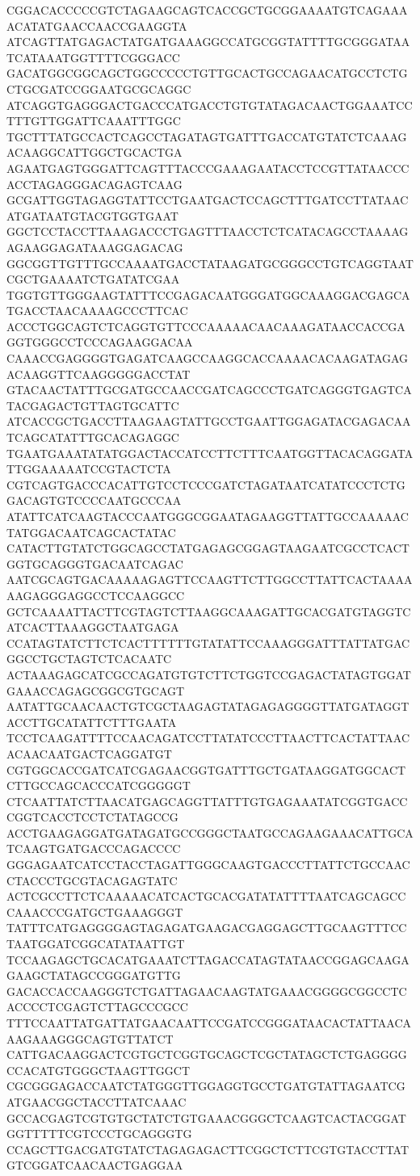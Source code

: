 CGGACACCCCCGTCTAGAAGCAGTCACCGCTGCGGAAAATGTCAGAAAACATATGAACCAACCGAAGGTA
ATCAGTTATGAGACTATGATGAAAGGCCATGCGGTATTTTGCGGGATAATCATAAATGGTTTTCGGGACC
GACATGGCGGCAGCTGGCCCCCTGTTGCACTGCCAGAACATGCCTCTGCTGCGATCCGGAATGCGCAGGC
ATCAGGTGAGGGACTGACCCATGACCTGTGTATAGACAACTGGAAATCCTTTGTTGGATTCAAATTTGGC
TGCTTTATGCCACTCAGCCTAGATAGTGATTTGACCATGTATCTCAAAGACAAGGCATTGGCTGCACTGA
AGAATGAGTGGGATTCAGTTTACCCGAAAGAATACCTCCGTTATAACCCACCTAGAGGGACAGAGTCAAG
GCGATTGGTAGAGGTATTCCTGAATGACTCCAGCTTTGATCCTTATAACATGATAATGTACGTGGTGAAT
GGCTCCTACCTTAAAGACCCTGAGTTTAACCTCTCATACAGCCTAAAAGAGAAGGAGATAAAGGAGACAG
GGCGGTTGTTTGCCAAAATGACCTATAAGATGCGGGCCTGTCAGGTAATCGCTGAAAATCTGATATCGAA
TGGTGTTGGGAAGTATTTCCGAGACAATGGGATGGCAAAGGACGAGCATGACCTAACAAAAGCCCTTCAC
ACCCTGGCAGTCTCAGGTGTTCCCAAAAACAACAAAGATAACCACCGAGGTGGGCCTCCCAGAAGGACAA
CAAACCGAGGGGTGAGATCAAGCCAAGGCACCAAAACACAAGATAGAGACAAGGTTCAAGGGGGACCTAT
GTACAACTATTTGCGATGCCAACCGATCAGCCCTGATCAGGGTGAGTCATACGAGACTGTTAGTGCATTC
ATCACCGCTGACCTTAAGAAGTATTGCCTGAATTGGAGATACGAGACAATCAGCATATTTGCACAGAGGC
TGAATGAAATATATGGACTACCATCCTTCTTTCAATGGTTACACAGGATATTGGAAAAATCCGTACTCTA
CGTCAGTGACCCACATTGTCCTCCCGATCTAGATAATCATATCCCTCTGGACAGTGTCCCCAATGCCCAA
ATATTCATCAAGTACCCAATGGGCGGAATAGAAGGTTATTGCCAAAAACTATGGACAATCAGCACTATAC
CATACTTGTATCTGGCAGCCTATGAGAGCGGAGTAAGAATCGCCTCACTGGTGCAGGGTGACAATCAGAC
AATCGCAGTGACAAAAAGAGTTCCAAGTTCTTGGCCTTATTCACTAAAAAAGAGGGAGGCCTCCAAGGCC
GCTCAAAATTACTTCGTAGTCTTAAGGCAAAGATTGCACGATGTAGGTCATCACTTAAAGGCTAATGAGA
CCATAGTATCTTCTCACTTTTTTGTATATTCCAAAGGGATTTATTATGACGGCCTGCTAGTCTCACAATC
ACTAAAGAGCATCGCCAGATGTGTCTTCTGGTCCGAGACTATAGTGGATGAAACCAGAGCGGCGTGCAGT
AATATTGCAACAACTGTCGCTAAGAGTATAGAGAGGGGTTATGATAGGTACCTTGCATATTCTTTGAATA
TCCTCAAGATTTTCCAACAGATCCTTATATCCCTTAACTTCACTATTAACACAACAATGACTCAGGATGT
CGTGGCACCGATCATCGAGAACGGTGATTTGCTGATAAGGATGGCACTCTTGCCAGCACCCATCGGGGGT
CTCAATTATCTTAACATGAGCAGGTTATTTGTGAGAAATATCGGTGACCCGGTCACCTCCTCTATAGCCG
ACCTGAAGAGGATGATAGATGCCGGGCTAATGCCAGAAGAAACATTGCATCAAGTGATGACCCAGACCCC
GGGAGAATCATCCTACCTAGATTGGGCAAGTGACCCTTATTCTGCCAACCTACCCTGCGTACAGAGTATC
ACTCGCCTTCTCAAAAACATCACTGCACGATATATTTTAATCAGCAGCCCAAACCCGATGCTGAAAGGGT
TATTTCATGAGGGGAGTAGAGATGAAGACGAGGAGCTTGCAAGTTTCCTAATGGATCGGCATATAATTGT
TCCAAGAGCTGCACATGAAATCTTAGACCATAGTATAACCGGAGCAAGAGAAGCTATAGCCGGGATGTTG
GACACCACCAAGGGTCTGATTAGAACAAGTATGAAACGGGGCGGCCTCACCCCTCGAGTCTTAGCCCGCC
TTTCCAATTATGATTATGAACAATTCCGATCCGGGATAACACTATTAACAAAGAAAGGGCAGTGTTATCT
CATTGACAAGGACTCGTGCTCGGTGCAGCTCGCTATAGCTCTGAGGGGCCACATGTGGGCTAAGTTGGCT
CGCGGGAGACCAATCTATGGGTTGGAGGTGCCTGATGTATTAGAATCGATGAACGGCTACCTTATCAAAC
GCCACGAGTCGTGTGCTATCTGTGAAACGGGCTCAAGTCACTACGGATGGTTTTTCGTCCCTGCAGGGTG
CCAGCTTGACGATGTATCTAGAGAGACTTCGGCTCTTCGTGTACCTTATGTCGGATCAACAACTGAGGAA
